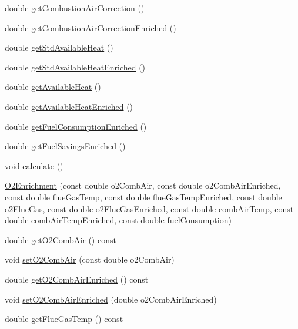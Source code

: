 \begin{DoxyCompactItemize}
\item 
double \hyperlink{class_o2_enrichment_a7ecca6a53529843246555ae33379d464}{get\+Combustion\+Air\+Correction} ()
\item 
double \hyperlink{class_o2_enrichment_aa8bbec67d760c83da77ce5b4ee01e41c}{get\+Combustion\+Air\+Correction\+Enriched} ()
\item 
double \hyperlink{class_o2_enrichment_a6eab50d08baaca010d208139cb99d239}{get\+Std\+Available\+Heat} ()
\item 
double \hyperlink{class_o2_enrichment_a24fd19f2aca20c7ba83061b832323ad6}{get\+Std\+Available\+Heat\+Enriched} ()
\item 
double \hyperlink{class_o2_enrichment_ac34e93c7e1444ab81a621428f0eee4d3}{get\+Available\+Heat} ()
\item 
double \hyperlink{class_o2_enrichment_afc7f9ea349f338ead76255218769a3e3}{get\+Available\+Heat\+Enriched} ()
\item 
double \hyperlink{class_o2_enrichment_aaf0dae071145b439e995d90f838878a7}{get\+Fuel\+Consumption\+Enriched} ()
\item 
double \hyperlink{class_o2_enrichment_a2aa9f8d3a02935931e705f82ae57c72f}{get\+Fuel\+Savings\+Enriched} ()
\item 
void \hyperlink{class_o2_enrichment_a91d7e18a336466cf9fbc0cae42dde282}{calculate} ()
\item 
\hyperlink{class_o2_enrichment_a8d60cf5ef65e8528a5a432c7cec75699}{O2\+Enrichment} (const double o2\+Comb\+Air, const double o2\+Comb\+Air\+Enriched, const double flue\+Gas\+Temp, const double flue\+Gas\+Temp\+Enriched, const double o2\+Flue\+Gas, const double o2\+Flue\+Gas\+Enriched, const double comb\+Air\+Temp, const double comb\+Air\+Temp\+Enriched, const double fuel\+Consumption)
\item 
double \hyperlink{class_o2_enrichment_a52953d4a55fd9e4d91030fe96d800f71}{get\+O2\+Comb\+Air} () const
\item 
void \hyperlink{class_o2_enrichment_a4ed21239c9e2ed2b193c94e9df0a9079}{set\+O2\+Comb\+Air} (const double o2\+Comb\+Air)
\item 
double \hyperlink{class_o2_enrichment_a0e9a9ec7987eaa673cb9527b293ded7c}{get\+O2\+Comb\+Air\+Enriched} () const
\item 
void \hyperlink{class_o2_enrichment_af781223d8201c4e5a1d0085718b0b36c}{set\+O2\+Comb\+Air\+Enriched} (double o2\+Comb\+Air\+Enriched)
\item 
double \hyperlink{class_o2_enrichment_a53083756c50aaf89f755a132b62e999b}{get\+Flue\+Gas\+Temp} () const

\end{DoxyCompactItemize}
